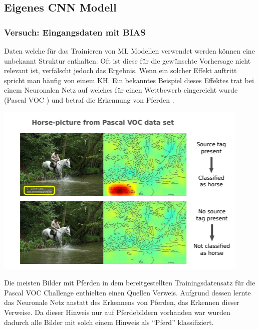 \documentclass[
  12pt, %
  a4paper, %
  oneside, %
  openany, 
  numbers=noenddot, %
  BCOR=5mm, %
  parskip=half*, %
  thesis, %
]{bfhbook}
\begin{document}
\subsection{Eigenes CNN Modell}

\subsubsection*{Versuch: Eingangsdaten mit BIAS}
Daten welche für das Trainieren von \Gls{ML} Modellen verwendet werden können eine unbekannt Struktur enthalten. Oft ist diese für die gewünschte Vorhersage nicht relevant ist, verfälscht jedoch das  Ergebnis. Wenn ein solcher Effekt auftritt spricht man häufig von einem \Gls{KH}. Ein bekanntes Beispiel dieses Effektes trat bei einem Neuronalen Netz auf welches für einen Wettbewerb eingereicht wurde (Pascal VOC \cite{Everingham_thepascal}) und betraf die Erkennung von Pferden \parencite{Lapuschkin2019}. 

\begin{center}
\begin{minipage}[t]{0.45\linewidth}
\vspace{0pt}
\includegraphics[width=\linewidth]{Bilder/HorsePredictionPascalVOC.PNG}
\end{minipage}\hfill
\begin{minipage}[t]{0.45\linewidth}
\vspace{20pt}
Die meisten Bilder mit Pferden in dem bereitgestellten Trainingsdatensatz für die Pascal VOC Challenge enthielten einen Quellen Verweis. Aufgrund dessen lernte das Neuronale Netz anstatt des Erkennens von  Pferden, das Erkennen dieser Verweise. Da dieser Hinweis nur auf Pferdebildern vorhanden war wurden dadurch alle Bilder mit solch einem Hinweis als ``Pferd'' klassifiziert.
\end{minipage}
\end{center}
\end{document}
